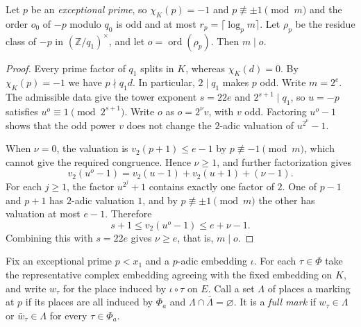\begin{lemma}
\label{lem:a-exceptional-order}
\emitthmsource
Let $p$ be an \emph{exceptional prime}, so $\chi_K(p)=-1$ and $p\not\equiv\pm1\pmod m$ and the order $o_0$ of $-p$ modulo $q_0$ is odd and at most $r_p=\lceil\log_p m\rceil$. Let $\rho_p$ be the residue class of $-p$ in $(\mathbb Z/q_1)^\times$, and let $o=\operatorname{ord}(\rho_p)$. Then $m\mid o$.
\end{lemma}
\begin{proof}
Every prime factor of $q_1$ splits in $K$, whereas $\chi_K(d)=0$. By $\chi_K(p)=-1$ we have $p\nmid q_1d$. In particular, $2\mid q_1$ makes $p$ odd. Write $m=2^e$. The admissible data give the tower exponent $s=22e$ and $2^{s+1}\mid q_1$, so $u=-p$ satisfies $u^o\equiv1\pmod{2^{s+1}}$. Write $o$ as $o=2^\nu v$, with $v$ odd. Factoring $u^o-1$ shows that the odd power $v$ does not change the $2$-adic valuation of $u^{2^\nu}-1$.

When $\nu=0$, the valuation is $v_2(p+1)\le e-1$ by $p\not\equiv-1\pmod m$, which cannot give the required congruence. Hence $\nu\ge1$, and further factorization gives
\[
 v_2(u^o-1)=v_2(u-1)+v_2(u+1)+(\nu-1).
\]
For each $j\ge1$, the factor $u^{2^j}+1$ contains exactly one factor of $2$. One of $p-1$ and $p+1$ has $2$-adic valuation $1$, and by $p\not\equiv\pm1\pmod m$ the other has valuation at most $e-1$. Therefore
\[
 s+1\le v_2(u^o-1)\le e+\nu-1.
\]
Combining this with $s=22e$ gives $\nu\ge e$, that is, $m\mid o$.
\end{proof}

Fix an exceptional prime $p<x_1$ and a $p$-adic embedding $\iota$. For each $\tau\in\Phi$ take the representative complex embedding agreeing with the fixed embedding on $K$, and write $w_\tau$ for the place induced by $\iota\circ\tau$ on $E$. Call a set $\Lambda$ of places a marking at $p$ if its places are all induced by $\Phi_a$ and $\Lambda\cap\bar\Lambda=\varnothing$. It is a \emph{full mark} if $w_\tau\in\Lambda$ or $\bar w_\tau\in\Lambda$ for every $\tau\in\Phi_a$.

